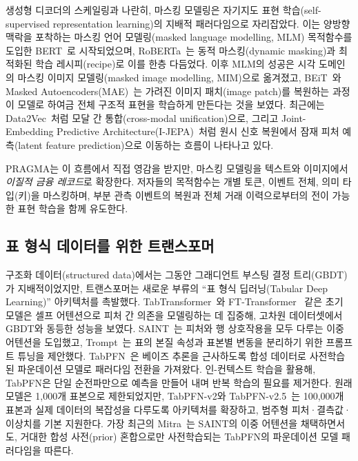 생성형 디코더의 스케일링과 나란히, 마스킹 모델링은 자기지도 표현 학습(self-supervised representation learning)의 지배적 패러다임으로 자리잡았다.
이는 양방향 맥락을 포착하는 마스킹 언어 모델링(masked language modelling, MLM) 목적함수를 도입한 BERT~\citep{devlin2019bert}로 시작되었으며, RoBERTa~\citep{liu2019roberta}는 동적 마스킹(dynamic masking)과 최적화된 학습 레시피(recipe)로 이를 한층 다듬었다.
이후 MLM의 성공은 시각 도메인의 마스킹 이미지 모델링(masked image modelling, MIM)으로 옮겨졌고, BEiT~\citep{bao2021beit}와 Masked Autoencoders(MAE)~\citep{he2022masked}는 가려진 이미지 패치(image patch)를 복원하는 과정이 모델로 하여금 전체 구조적 표현을 학습하게 만든다는 것을 보였다.
최근에는 Data2Vec~\citep{baevski2022data2vec}처럼 모달 간 통합(cross-modal unification)으로, 그리고 Joint-Embedding Predictive Architecture(I-JEPA)~\citep{assran2023self}처럼 원시 신호 복원에서 잠재 피처 예측(latent feature prediction)으로 이동하는 흐름이 나타나고 있다.

PRAGMA는 이 흐름에서 직접 영감을 받지만, 마스킹 모델링을 텍스트와 이미지에서 \emph{이질적 금융 레코드}로 확장한다.
저자들의 목적함수는 개별 토큰, 이벤트 전체, 의미 타입(키)을 마스킹하며, 부분 관측 이벤트의 복원과 전체 거래 이력으로부터의 전이 가능한 표현 학습을 함께 유도한다.



\subsection{표 형식 데이터를 위한 트랜스포머}
\label{sec:rw-tabular}

구조화 데이터(structured data)에서는 그동안 그래디언트 부스팅 결정 트리(GBDT)가 지배적이었지만, 트랜스포머는 새로운 부류의 ``표 형식 딥러닝(Tabular Deep Learning)'' 아키텍처를 촉발했다.
TabTransformer~\citep{huang2020tabtransformer}와 FT-Transformer~\citep{gorishniy2021revisiting} 같은 초기 모델은 셀프 어텐션으로 피처 간 의존을 모델링하는 데 집중해, 고차원 데이터셋에서 GBDT와 동등한 성능을 보였다.
SAINT~\citep{somepalli2021saint}는 피처와 행 상호작용을 모두 다루는 이중 어텐션을 도입했고, Trompt~\citep{chen2023trompt}는 표의 본질 속성과 표본별 변동을 분리하기 위한 프롬프트 튜닝을 제안했다.
TabPFN~\citep{hollmann2023tabpfn}은 베이즈 추론을 근사하도록 합성 데이터로 사전학습된 파운데이션 모델로 패러다임 전환을 가져왔다.
인-컨텍스트 학습을 활용해, TabPFN은 단일 순전파만으로 예측을 만들어 내며 반복 학습의 필요를 제거한다.
원래 모델은 1{,}000개 표본으로 제한되었지만, TabPFN-v2와 TabPFN-v2.5~\citep{hollmann2025accurate,grinsztajn2025tabpfn}는 100{,}000개 표본과 실제 데이터의 복잡성을 다루도록 아키텍처를 확장하고, 범주형 피처·결측값·이상치를 기본 지원한다.
가장 최근의 Mitra~\citep{zhang2025mitra}는 SAINT의 이중 어텐션을 채택하면서도, 거대한 합성 사전(prior) 혼합으로만 사전학습되는 TabPFN의 파운데이션 모델 패러다임을 따른다.

